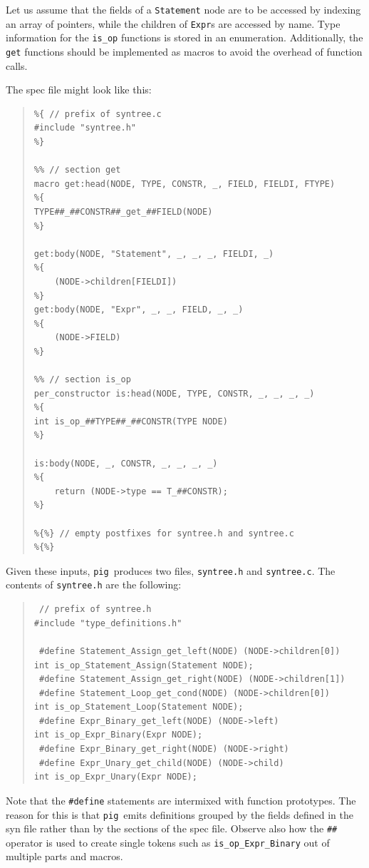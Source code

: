 \documentclass[a4paper,12pt]{article}
\def\pig{{\tt pig}}
\begin{document}
Let us assume that the fields of a \verb+Statement+ node are to be
accessed by indexing an array of pointers, while the children of
\verb+Expr+s are accessed by name. Type information for the
\verb+is_op+ functions is stored in an enumeration. Additionally,
the \verb+get+ functions should be implemented as macros to avoid
the overhead of function calls.

The spec file might look like this:

\begin{quote}
\begin{verbatim}
%{ // prefix of syntree.c
#include "syntree.h"
%}

%% // section get
macro get:head(NODE, TYPE, CONSTR, _, FIELD, FIELDI, FTYPE)
%{
TYPE##_##CONSTR##_get_##FIELD(NODE)
%}

get:body(NODE, "Statement", _, _, _, FIELDI, _)
%{
    (NODE->children[FIELDI])
%}
get:body(NODE, "Expr", _, _, FIELD, _, _)
%{
    (NODE->FIELD)
%}

%% // section is_op
per_constructor is:head(NODE, TYPE, CONSTR, _, _, _, _)
%{
int is_op_##TYPE##_##CONSTR(TYPE NODE)
%}

is:body(NODE, _, CONSTR, _, _, _, _)
%{
    return (NODE->type == T_##CONSTR);
%}

%{%} // empty postfixes for syntree.h and syntree.c
%{%}
\end{verbatim}
\end{quote}

Given these inputs, \pig\ produces two files, \verb+syntree.h+ and
\verb+syntree.c+. The contents of \verb+syntree.h+ are the
following:

\begin{quote}
\begin{verbatim}
 // prefix of syntree.h
#include "type_definitions.h"

 #define Statement_Assign_get_left(NODE) (NODE->children[0])
int is_op_Statement_Assign(Statement NODE);
 #define Statement_Assign_get_right(NODE) (NODE->children[1])
 #define Statement_Loop_get_cond(NODE) (NODE->children[0])
int is_op_Statement_Loop(Statement NODE);
 #define Expr_Binary_get_left(NODE) (NODE->left)
int is_op_Expr_Binary(Expr NODE);
 #define Expr_Binary_get_right(NODE) (NODE->right)
 #define Expr_Unary_get_child(NODE) (NODE->child)
int is_op_Expr_Unary(Expr NODE);
\end{verbatim}
\end{quote}

Note that the \verb+#define+ statements are intermixed with function
prototypes. The reason for this is that \pig\ emits definitions
grouped by the fields defined in the syn file rather than by the
sections of the spec file. Observe also how the \verb+##+ operator
is used to create single tokens such as \verb+is_op_Expr_Binary+ out
of multiple parts and macros.
\end{document}
